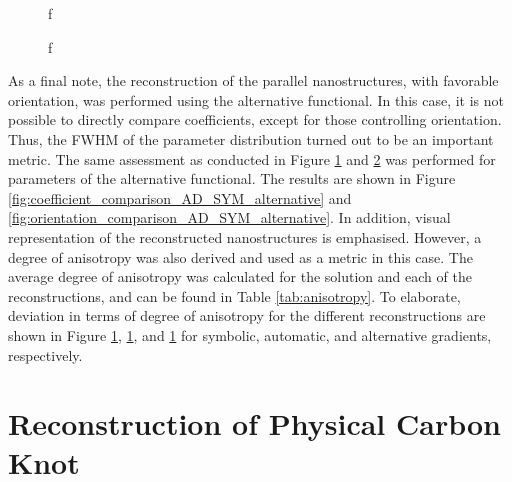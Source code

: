 \begin{figure}[h!]
    \centering
    \caption{f}
    \label{fig:coefficient_comparison_AD_SYM}
\end{figure}

\begin{figure}[h!]
    \centering
    \caption{ f   }
    \label{fig:orientation_comparison_AD_SYM}
\end{figure}

As a final note, the reconstruction of the parallel nanostructures, with favorable orientation, was performed using the alternative functional.
In this case, it is not possible to directly compare coefficients, except for those controlling orientation.
Thus, the FWHM of the parameter distribution turned out to be an important metric.
The same assessment as conducted in Figure \ref{fig:coefficient_comparison_AD_SYM} and \ref{fig:orientation_comparison_AD_SYM} was performed for parameters of the alternative functional.
The results are shown in Figure \ref{fig:coefficient_comparison_AD_SYM_alternative} and \ref{fig:orientation_comparison_AD_SYM_alternative}.
In addition, visual representation of the reconstructed nanostructures is emphasised. %
However, a degree of anisotropy was also derived and used as a metric in this case. %
The average degree of anisotropy was calculated for the solution and each of the reconstructions, and can be found in Table \ref{tab:anisotropy}.
To elaborate, deviation in terms of degree of anisotropy for the different reconstructions are shown in Figure \ref{}, \ref{}, and \ref{} for symbolic, automatic, and alternative gradients, respectively.


\clearpage
\section{Reconstruction of Physical Carbon Knot}


